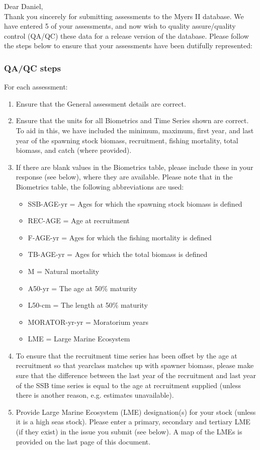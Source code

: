 \documentclass [a4paper, 10pt] {article}
\begin{document}
\noindent Dear Daniel,\\

\noindent Thank you sincerely for submitting assessments to the Myers II database. We have entered 5 of your assessments, and now wish to quality assure/quality control (QA/QC) these data for a release version of the database. Please follow the steps below to ensure that your assessments have been dutifully represented:
\subsubsection{QA/QC steps}
For each assessment:
\begin{enumerate}
\item Ensure that the General assessment details are correct.
\item Ensure that the units for all Biometrics and Time Series shown are correct. To aid in this, we have included the minimum, maximum, first year, and last year of the spawning stock biomass, recruitment, fishing mortality, total biomass, and  catch  (where provided). 
\item If there are blank values in the Biometrics table, please include these in your response (see below), where they are available.
Please note that in the Biometrics table, the following abbreviations are used:
\begin{itemize}
\item SSB-AGE-yr  = Ages for which the spawning stock biomass is defined
\item REC-AGE     = Age at recruitment
\item F-AGE-yr    = Ages for which the fishing mortality is defined 
\item TB-AGE-yr   = Ages for which the total biomass is defined
\item M      = Natural mortality
\item A50-yr      = The age at 50\% maturity
\item L50-cm      = The length at 50\% maturity
\item MORATOR-yr-yr = Moratorium years
\item LME = Large Marine Ecosystem\\
\end{itemize}
\item To ensure that the recruitment time series has been offset by the age at recruitment so that yearclass matches up with spawner biomass, please make sure that the difference between the last year of the recruitment and last year of the SSB time series is equal to the age at recruitment supplied (unless there is another reason, e.g. estimates unavailable). 
\item Provide Large Marine Ecosystem (LME) designation(s) for your stock (unless it is a high seas stock). Please enter a primary, secondary and tertiary LME (if they exist) in the issue you submit (see below). A map of the LMEs is provided on the last page of this document. 
\end{enumerate}
\vspace{-.25in}
\end{document}
